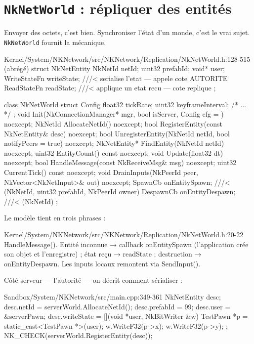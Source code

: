 \section{\texttt{NkNetWorld} : répliquer des entités}

Envoyer des octets, c'est bien. Synchroniser l'état d'un monde, c'est le vrai
sujet. \texttt{NkNetWorld} fournit la mécanique.

\begin{nkcode}{Kernel/System/NKNetwork/src/NKNetwork/Replication/NkNetWorld.h:128-515 (abrégé)}
struct NkNetEntity {
        NkNetId netId;  uint32 prefabId;  void* user;
        WriteStateFn writeState;   ///< serialise l'etat — appele cote AUTORITE
        ReadStateFn  readState;    ///< applique un etat recu — cote replique
};

class NkNetWorld {
        struct Config { float32 tickRate; uint32 keyframeInterval; /* ... */ };
        void Init(NkConnectionManager* mgr, bool isServer, Config cfg = {}) noexcept;
        NkNetId AllocateNetId() noexcept;
        bool RegisterEntity(const NkNetEntity& desc) noexcept;
        bool UnregisterEntity(NkNetId netId, bool notifyPeers = true) noexcept;
        NkNetEntity* FindEntity(NkNetId netId) noexcept;
        uint32 EntityCount() const noexcept;
        void Update(float32 dt) noexcept;
        bool HandleMessage(const NkReceiveMsg& msg) noexcept;
        uint32 CurrentTick() const noexcept;
        void DrainInputs(NkPeerId peer, NkVector<NkNetInput>& out) noexcept;
        SpawnCb   onEntitySpawn;      ///< (NkNetId, uint32 prefabId, NkPeerId owner)
        DespawnCb onEntityDespawn;    ///< (NkNetId)
};
\end{nkcode}

Le modèle tient en trois phrases :

\begin{nkcode}{Kernel/System/NKNetwork/src/NKNetwork/Replication/NkNetWorld.h:20-22}
 HandleMessage(). Entité inconnue → callback onEntitySpawn (l'application
 crée son objet et l'enregistre) ; état reçu → readState ; destruction →
 onEntityDespawn. Les inputs locaux remontent via SendInput().
\end{nkcode}

Côté serveur — l'autorité — on décrit comment sérialiser :

\begin{nkcode}{Sandbox/System/NKNetwork/src/main.cpp:349-361}
        NkNetEntity desc;
        desc.netId = serverWorld.AllocateNetId();
        desc.prefabId = 99;
        desc.user = &serverPawn;
        desc.writeState = [](void *user, NkBitWriter &w) {
            TestPawn *p = static_cast<TestPawn *>(user);
            w.WriteF32(p->x);
            w.WriteF32(p->y);
        };
        NK_CHECK(serverWorld.RegisterEntity(desc));
\end{nkcode}

